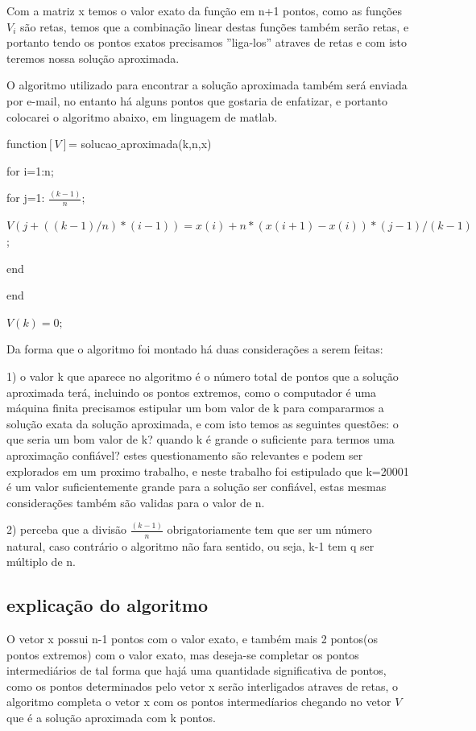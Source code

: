 \documentclass[a4paper]{article}
\begin{document}
  
  
Com a matriz x temos o valor exato da função em n+1 pontos, como as funções \(V_i\) são retas, temos que a combinação linear destas funções também serão retas, e portanto tendo os pontos exatos precisamos ''liga-los'' atraves de retas e com isto teremos nossa solução aproximada.

O algoritmo utilizado para encontrar a solução aproximada também será enviada por e-mail, no entanto há alguns pontos que gostaria de enfatizar, e portanto colocarei o algoritmo abaixo, em linguagem de matlab.

function\([V]\)= solucao$\_$aproximada(k,n,x)

      for i=1:n;
          
          for j=1: \(\frac{(k-1)}{n}\);

          \(V(j+((k-1)/n)*(i-1))= x(i) + n*(x(i+1)-x(i))*(j-1)/(k-1)\);

          end

      end
   
     \(V(k)=0;\)
     
     Da forma que o algoritmo foi montado há duas considerações a serem feitas:
     
     1) o valor k que aparece no algoritmo é o número total de pontos que a solução aproximada terá, incluindo os pontos extremos, como o computador é uma máquina finita precisamos estipular um bom valor de k para compararmos a solução exata da solução aproximada, e com isto temos as seguintes questões: o que seria um bom valor de k? quando k é grande o suficiente para termos uma aproximação confiável? estes questionamento são relevantes e podem ser explorados em um proximo trabalho, e neste trabalho foi estipulado que k=20001 é um valor suficientemente grande para a solução ser confiável, estas mesmas considerações também são validas para o valor de n.

    2) perceba que a divisão \(\frac{(k-1)}{n}\) obrigatoriamente tem que ser um número natural, caso contrário o algoritmo não fara sentido, ou seja, k-1 tem q ser múltiplo de n.
    
    \subsection{explicação do algoritmo}

   O vetor x possui n-1 pontos com o valor exato, e também mais 2 pontos(os pontos extremos) com o valor exato, mas deseja-se completar os pontos intermediários de tal forma que hajá uma quantidade significativa de pontos, como os pontos determinados pelo vetor x serão interligados atraves de retas, o algoritmo completa o vetor x com os pontos intermedíarios chegando no vetor \(V\) que é a solução aproximada com k pontos.
\end{document}
